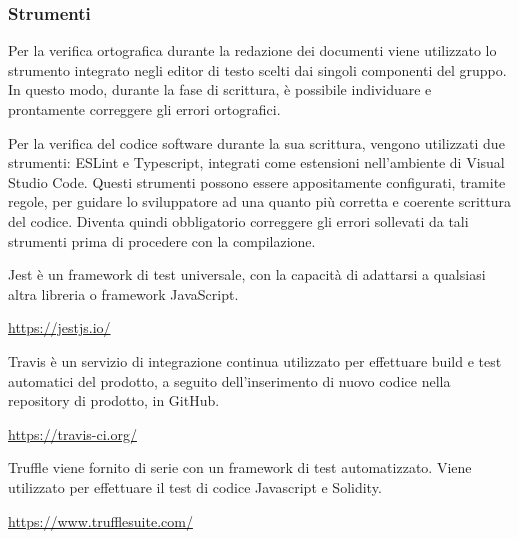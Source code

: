    \subsubsection{Strumenti}
	    Per la verifica ortografica durante la redazione dei documenti viene utilizzato lo strumento integrato negli editor di testo scelti dai singoli componenti del gruppo. In questo modo, durante la fase di scrittura, è possibile individuare e prontamente correggere gli errori ortografici. 
	    
    	Per la verifica del codice software durante la sua scrittura, vengono utilizzati due strumenti: ESLint e Typescript, integrati come estensioni nell'ambiente di Visual Studio Code. Questi strumenti possono essere appositamente configurati, tramite regole, per guidare lo sviluppatore ad una quanto più corretta e coerente scrittura del codice. Diventa quindi obbligatorio correggere gli errori sollevati da tali strumenti prima di procedere con la compilazione.
    	
    	Jest è un framework di test universale, con la capacità di adattarsi a qualsiasi altra libreria o framework JavaScript.
    	\begin{center}
    		\url{https://jestjs.io/}
    	\end{center}
    	
    	Travis è un servizio di integrazione continua utilizzato per effettuare build e test automatici del prodotto, a seguito dell'inserimento di nuovo codice nella repository di prodotto, in GitHub.
    	\begin{center}
    		\url{https://travis-ci.org/}
    	\end{center}
    
    	Truffle viene fornito di serie con un framework di test automatizzato. Viene utilizzato per effettuare il test di codice Javascript e Solidity.
    	\begin{center}
    		\url{https://www.trufflesuite.com/}
    	\end{center}
	    
    	